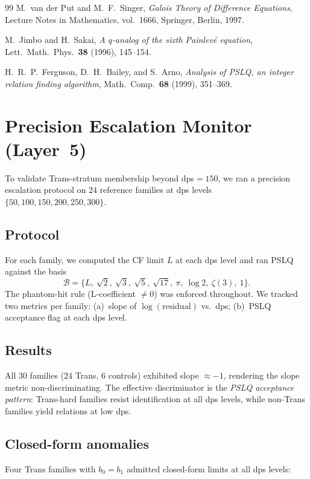 \documentclass[11pt]{amsart}
\theoremstyle{definition}
\theoremstyle{remark}
\begin{document}
\begin{thebibliography}{99}
M.~van der Put and M.~F.~Singer,
\emph{Galois Theory of Difference Equations},
Lecture Notes in Mathematics, vol.~1666, Springer, Berlin, 1997.

M.~Jimbo and H.~Sakai,
\emph{A $q$-analog of the sixth Painlevé equation},
Lett.\ Math.\ Phys.\ \textbf{38} (1996), 145--154.

H.~R.~P.~Ferguson, D.~H.~Bailey, and S.~Arno,
\emph{Analysis of PSLQ, an integer relation finding algorithm},
Math.\ Comp.\ \textbf{68} (1999), 351--369.

\end{thebibliography}

\section{Precision Escalation Monitor (Layer~5)}\label{app:t2c}

To validate Trans-stratum membership beyond dps$=150$, we ran a
precision escalation protocol on $24$ reference families at dps levels
$\{50, 100, 150, 200, 250, 300\}$.

\subsection*{Protocol}
For each family, we computed the CF limit $L$ at each dps level and
ran PSLQ against the basis
\[
\mathcal{B} = \{L,\ \sqrt{2},\ \sqrt{3},\ \sqrt{5},\ \sqrt{17},\
\pi,\ \log 2,\ \zeta(3),\ 1\}.
\]
The phantom-hit rule (L-coefficient $\neq 0$) was enforced throughout.
We tracked two metrics per family:
(a)~slope of $\log(\text{residual})$ vs.\ dps;
(b)~PSLQ acceptance flag at each dps level.

\subsection*{Results}
All $30$ families ($24$ Trans, $6$ controls) exhibited slope
$\approx -1$, rendering the slope metric non-discriminating.  The
effective discriminator is the \emph{PSLQ acceptance pattern}:
Trans-hard families resist identification at all dps levels, while
non-Trans families yield relations at low dps.

\subsection*{Closed-form anomalies}
Four Trans families with $b_0 = b_1$ admitted closed-form limits at
all dps levels:
\end{document}
